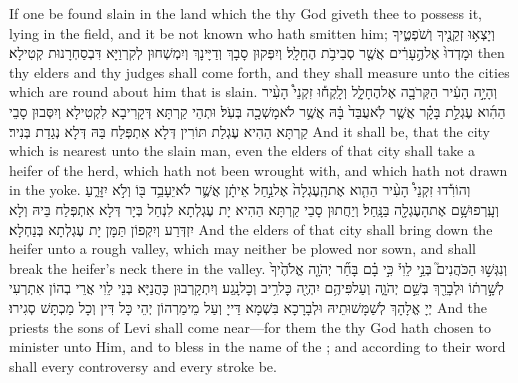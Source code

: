 {If one be found slain in the land which the \lord\space thy God giveth thee to possess it, lying in the field, and it be not known who hath smitten him;}{}
{וְיָצְא֥וּ זְקֵנֶ֖יךָ וְשֹׁפְטֶ֑יךָ וּמָדְדוּ֙ אֶל\maqqaf הֶ֣עָרִ֔ים אֲשֶׁ֖ר סְבִיבֹ֥ת הֶחָלָֽל׃}
{וְיִפְּקוּן סָבָךְ וְדַיָּינָךְ וְיִמְשְׁחוּן לְקִרְוַיָּא דִּבְסַחְרָנוּת קְטִילָא׃}
{then thy elders and thy judges shall come forth, and they shall measure unto the cities which are round about him that is slain.}{}
{וְהָיָ֣ה הָעִ֔יר הַקְּרֹבָ֖ה אֶל\maqqaf הֶחָלָ֑ל וְלָֽקְח֡וּ זִקְנֵי֩ הָעִ֨יר הַהִ֜וא עֶגְלַ֣ת בָּקָ֗ר אֲשֶׁ֤ר לֹֽא\maqqaf עֻבַּד֙ בָּ֔הּ אֲשֶׁ֥ר לֹא\maqqaf מָשְׁכָ֖ה בְּעֹֽל׃}
{וּתְהֵי קַרְתָּא דְּקָרִיבָא לִקְטִילָא וְיִסְּבוּן סָבֵי קַרְתָּא הַהִיא עֶגְלַת תּוֹרִין דְּלָא אִתְפְּלַח בַּהּ דְּלָא נְגַדַת בְּנִיר׃}
{And it shall be, that the city which is nearest unto the slain man, even the elders of that city shall take a heifer of the herd, which hath not been wrought with, and which hath not drawn in the yoke.}{}
{וְהוֹרִ֡דוּ זִקְנֵי֩ הָעִ֨יר הַהִ֤וא אֶת\maqqaf הָֽעֶגְלָה֙ אֶל\maqqaf נַ֣חַל אֵיתָ֔ן אֲשֶׁ֛ר לֹא\maqqaf יֵעָבֵ֥ד בּ֖וֹ וְלֹ֣א יִזָּרֵ֑עַ וְעָֽרְפוּ\maqqaf שָׁ֥ם אֶת\maqqaf הָעֶגְלָ֖ה בַּנָּֽחַל׃}
{וְיַחֲתוּן סָבֵי קַרְתָּא הַהִיא יָת עֶגְלְתָא לִנְחַל בְּיָר דְּלָא אִתְפְּלַח בֵּיהּ וְלָא יִזְדְּרַע וְיִקְפוֹן תַּמָּן יָת עֶגְלְתָא בְּנַחְלָא׃}
{And the elders of that city shall bring down the heifer unto a rough valley, which may neither be plowed nor sown, and shall break the heifer’s neck there in the valley.}{}
{וְנִגְּשׁ֣וּ הַכֹּהֲנִים֮ בְּנֵ֣י לֵוִי֒ כִּ֣י בָ֗ם בָּחַ֞ר יְהֹוָ֤ה אֱלֹהֶ֙יךָ֙ לְשָׁ֣רְת֔וֹ וּלְבָרֵ֖ךְ בְּשֵׁ֣ם יְהֹוָ֑ה וְעַל\maqqaf פִּיהֶ֥ם יִהְיֶ֖ה כׇּל\maqqaf רִ֥יב וְכׇל\maqqaf נָֽגַע׃}
{וְיִתְקָרְבוּן כָּהֲנַיָּא בְּנֵי לֵוִי אֲרֵי בְהוֹן אִתְרְעִי יְיָ אֱלָהָךְ לְשַׁמָּשׁוּתֵיהּ וּלְבָרָכָא בִּשְׁמָא דַּייָ וְעַל מֵימַרְהוֹן יְהֵי כָּל דִּין וְכָל מַכְתָּשׁ סְגִירוּ׃}
{And the priests the sons of Levi shall come near—for them the \lord\space thy God hath chosen to minister unto Him, and to bless in the name of the \lord; and according to their word shall every controversy and every stroke be.}{}
